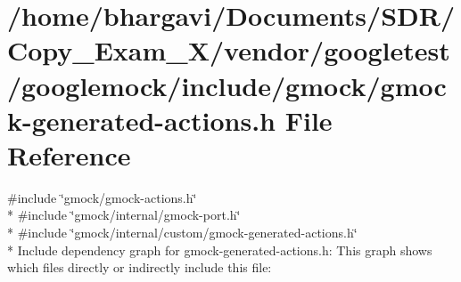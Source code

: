 \hypertarget{gmock-generated-actions_8h}{}\section{/home/bhargavi/\+Documents/\+S\+D\+R/\+Copy\+\_\+\+Exam\+\_\+X/vendor/googletest/googlemock/include/gmock/gmock-\/generated-\/actions.h File Reference}
\label{gmock-generated-actions_8h}
{\ttfamily \#include \char`\"{}gmock/gmock-\/actions.\+h\char`\"{}}\\*
{\ttfamily \#include \char`\"{}gmock/internal/gmock-\/port.\+h\char`\"{}}\\*
{\ttfamily \#include \char`\"{}gmock/internal/custom/gmock-\/generated-\/actions.\+h\char`\"{}}\\*
Include dependency graph for gmock-\/generated-\/actions.h\+:
This graph shows which files directly or indirectly include this file\+:
